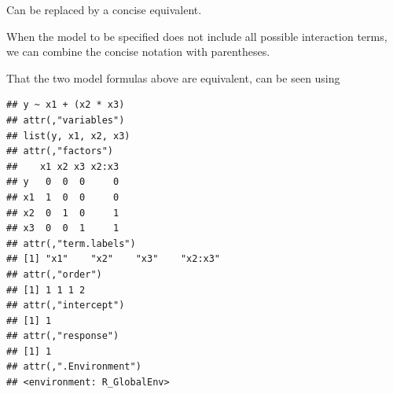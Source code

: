 \documentclass[krantz2]{krantz}\usepackage{knitr}%
\begin{document}
Can be replaced by a concise equivalent.

\begin{knitrout}\footnotesize
{}\color{fgcolor}\begin{kframe}
\begin{alltt}
 \hlopt{~}  \hlopt{*}  \hlopt{*} 
\end{alltt}
\end{kframe}
\end{knitrout}

When the model to be specified does not include all possible interaction terms, we can combine the concise notation with parentheses.

\begin{knitrout}\footnotesize
{}\color{fgcolor}\begin{kframe}
\begin{alltt}
 \hlopt{~}  \hlopt{+}  \hlopt{*} 
 \hlopt{~}  \hlopt{+}  \hlopt{+}  \hlopt{+} \hlopt{:}
\end{alltt}
\end{kframe}
\end{knitrout}

That the two model formulas above are equivalent, can be seen using 

\begin{knitrout}\footnotesize
{}\color{fgcolor}\begin{kframe}
\begin{alltt}
 \hlopt{~}  \hlopt{+}  \hlopt{*} 
\end{alltt}
\begin{verbatim}
## y ~ x1 + (x2 * x3)
## attr(,"variables")
## list(y, x1, x2, x3)
## attr(,"factors")
##    x1 x2 x3 x2:x3
## y   0  0  0     0
## x1  1  0  0     0
## x2  0  1  0     1
## x3  0  0  1     1
## attr(,"term.labels")
## [1] "x1"    "x2"    "x3"    "x2:x3"
## attr(,"order")
## [1] 1 1 1 2
## attr(,"intercept")
## [1] 1
## attr(,"response")
## [1] 1
## attr(,".Environment")
## <environment: R_GlobalEnv>
\end{verbatim}
\end{kframe}
\end{knitrout}

\begin{knitrout}\footnotesize
{}\color{fgcolor}\begin{kframe}
\begin{alltt}
 \hlopt{~}  \hlopt{*}  \hlopt{+} 
 \hlopt{~}  \hlopt{+}  \hlopt{+}  \hlopt{+} \hlopt{:} \hlopt{+} \hlopt{:}
\end{alltt}
\end{kframe}
\end{knitrout}
\end{document}
